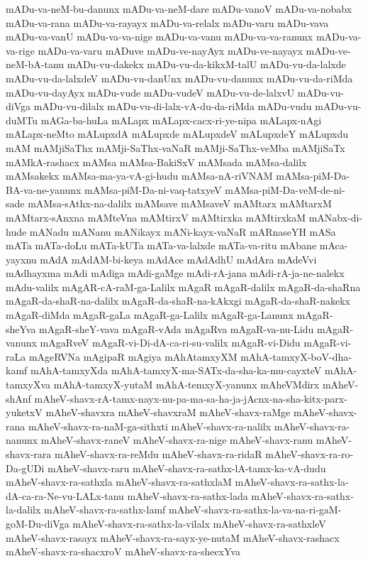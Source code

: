 {mADu-va-neM-bu-danunx
mADu-va-neM-dare
mADu-vanoV
mADu-va-nobabx
mADu-va-rana
mADu-va-rayayx
mADu-va-relalx
mADu-varu
mADu-vava
mADu-va-vanU
mADu-va-va-nige
mADu-va-vanu
mADu-va-va-ranunx
mADu-va-va-rige
mADu-va-varu
mADuve
mADu-ve-nayAyx
mADu-ve-nayayx
mADu-ve-neM-bA-tanu
mADu-vu-dakekx
mADu-vu-da-kikxM-talU
mADu-vu-da-lalxde
mADu-vu-da-lalxdeV
mADu-vu-danUnx
mADu-vu-danunx
mADu-vu-da-riMda
mADu-vu-dayAyx
mADu-vude
mADu-vudeV
mADu-vu-de-lalxvU
mADu-vu-diVga
mADu-vu-dilalx
mADu-vu-di-lalx-vA-du-da-riMda
mADu-vudu
mADu-vu-duMTu
mAGa-ba-huLa
mALapx
mALapx-cacx-ri-ye-nipa
mALapx-nAgi
mALapx-neMto
mALupxdA
mALupxde
mALupxdeV
mALupxdeY
mALupxdu
mAM
mAMjiSaThx
mAMji-SaThx-vaNaR
mAMji-SaThx-veMba
mAMjiSaTx
mAMkA-rashacx
mAMsa
mAMsa-BakiSxV
mAMsada
mAMsa-dalilx
mAMsakekx
mAMsa-ma-ya-vA-gi-hudu
mAMsa-nA-riVNAM
mAMsa-piM-Da-BA-va-ne-yanunx
mAMsa-piM-Da-ni-vaq-tatxyeV
mAMsa-piM-Da-veM-de-ni-sade
mAMsa-sAthx-na-dalilx
mAMsave
mAMsaveV
mAMtarx
mAMtarxM
mAMtarx-sAnxna
mAMteVna
mAMtirxV
mAMtirxka
mAMtirxkaM
mANabx-di-hude
mANadu
mANanu
mANikayx
mANi-kayx-vaNaR
mARnaseYH
mASa
mATa
mATa-doLu
mATa-kUTa
mATa-va-lalxde
mATa-va-ritu
mAbane
mAca-yayxnu
mAdA
mAdAM-bi-keya
mAdAce
mAdAdhU
mAdAra
mAdeVvi
mAdhayxma
mAdi
mAdiga
mAdi-gaMge
mAdi-rA-jana
mAdi-rA-ja-ne-nalekx
mAdu-valilx
mAgAR-cA-raM-ga-Lalilx
mAgaR
mAgaR-dalilx
mAgaR-da-shaRna
mAgaR-da-shaR-na-dalilx
mAgaR-da-shaR-na-kAkxgi
mAgaR-da-shaR-nakekx
mAgaR-diMda
mAgaR-gaLa
mAgaR-ga-Lalilx
mAgaR-ga-Lanunx
mAgaR-sheYva
mAgaR-sheY-vava
mAgaR-vAda
mAgaRva
mAgaR-va-nu-Lidu
mAgaR-vanunx
mAgaRveV
mAgaR-vi-Di-dA-ca-ri-su-valilx
mAgaR-vi-Didu
mAgaR-vi-raLa
mAgeRVNa
mAgipaR
mAgiya
mAhAtamxyXM
mAhA-tamxyX-boV-dha-kamf
mAhA-tamxyXda
mAhA-tamxyX-ma-SATx-da-sha-ka-mu-cayxteV
mAhA-tamxyXva
mAhA-tamxyX-yutaM
mAhA-temxyX-yanunx
mAheVMdirx
mAheV-shAnf
mAheV-shavx-rA-tamx-nayx-nu-pa-ma-sa-ha-ja-jAcnx-na-sha-kitx-parx-yuketxV
mAheV-shavxra
mAheV-shavxraM
mAheV-shavx-raMge
mAheV-shavx-rana
mAheV-shavx-ra-naM-ga-sithxti
mAheV-shavx-ra-nalilx
mAheV-shavx-ra-nanunx
mAheV-shavx-raneV
mAheV-shavx-ra-nige
mAheV-shavx-ranu
mAheV-shavx-rara
mAheV-shavx-ra-reMdu
mAheV-shavx-ra-ridaR
mAheV-shavx-ra-ro-Da-gUDi
mAheV-shavx-raru
mAheV-shavx-ra-sathx-lA-tamx-ka-vA-dudu
mAheV-shavx-ra-sathxla
mAheV-shavx-ra-sathxlaM
mAheV-shavx-ra-sathx-la-dA-ca-ra-Ne-vu-LALx-tanu
mAheV-shavx-ra-sathx-lada
mAheV-shavx-ra-sathx-la-dalilx
mAheV-shavx-ra-sathx-lamf
mAheV-shavx-ra-sathx-la-va-na-ri-gaM-goM-Du-diVga
mAheV-shavx-ra-sathx-la-vilalx
mAheV-shavx-ra-sathxleV
mAheV-shavx-rasayx
mAheV-shavx-ra-sayx-ye-nutaM
mAheV-shavx-rashacx
mAheV-shavx-ra-shacxroV
mAheV-shavx-ra-shecxYva
}
